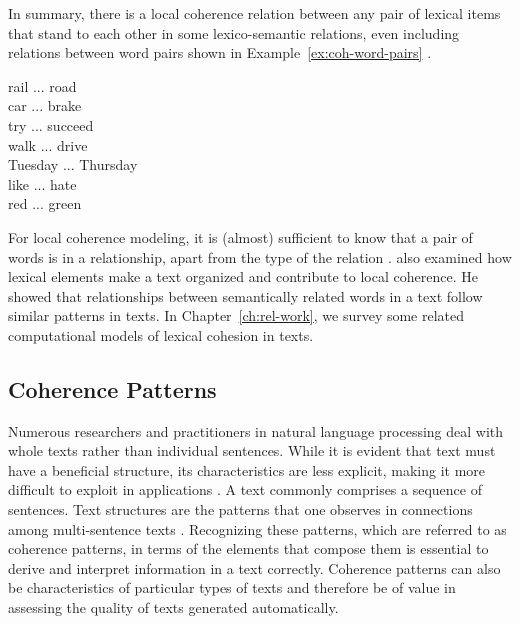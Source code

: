 

In summary, there is a local coherence relation between any pair of lexical items that stand to each other in some lexico-semantic relations, even including relations between word pairs shown in Example~\ref{ex:coh-word-pairs} \cite{halliday76}. %

\begin{examples}
    \label{ex:coh-word-pairs}
    rail ... road \\
    car ... brake \\
    try ... succeed \\
    walk ... drive \\
    Tuesday ... Thursday \\
    like ... hate \\
    red ... green 
\end{examples}

For local coherence modeling, it is (almost) sufficient to know that a pair of words is in a relationship, apart from the type of the relation \cite{halliday76}. %
 also examined how lexical elements make a text organized and contribute to local coherence. 
He showed that relationships between semantically related words in a text follow similar patterns in texts. 
In Chapter~\ref{ch:rel-work}, we survey some related computational models of lexical cohesion in texts.  

\subsection{Coherence Patterns}

Numerous researchers and practitioners in natural language processing deal with whole texts rather than individual sentences. 
While it is evident that text must have a beneficial structure, its characteristics are less explicit, making it more difficult to exploit in applications \cite{webber12a}. 
A text commonly comprises a sequence of sentences. 
Text structures are the patterns that one observes in connections among multi-sentence texts \cite{webber12a}. 
Recognizing these patterns, which are referred to as coherence patterns, in terms of the elements that compose them is essential to derive and interpret information in a text correctly. 
Coherence patterns can also be characteristics of particular types of texts and therefore be of value in assessing the quality of texts generated automatically. 


